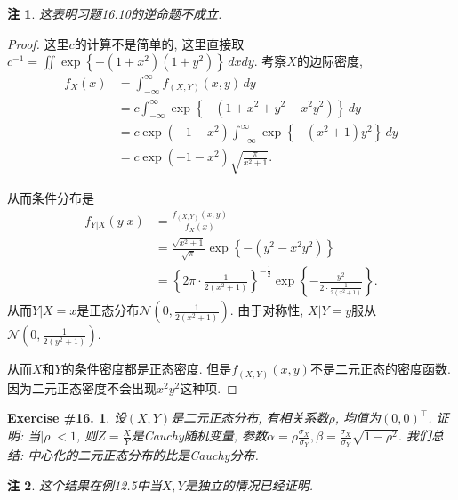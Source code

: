 \documentclass[UTF8, a4paper]{article}
\newtheorem{exercise}{Exercise \#16.}
\newtheorem*{remark}{注}
\begin{document}
\begin{remark}
这表明习题16.10的逆命题不成立.
\end{remark}


\begin{proof}
这里\(c\)的计算不是简单的, 这里直接取\(c^{-1} = \iint \exp \left\{-\left(1+x^2\right)\left(1+y^2\right)\right\} \, dx dy\).
考察\(X\)的边际密度,
\begin{align*}
f_X(x) &= \int_{-\infty}^\infty f_{(X,Y)}(x, y) \, dy \\
&= c \int_{-\infty}^\infty \exp \left\{-\left(1+x^2+y^2 + x^2 y^2\right)\right\} \, dy \\
&= c \exp\left( - 1 - x^2\right)\int_{-\infty}^\infty \exp \left\{-(x^2 + 1) y^2\right\} \, dy \\
&= c \exp\left( - 1 - x^2\right) \sqrt{\frac{\pi}{x^2 + 1}}.
\end{align*}

从而条件分布是
\begin{align*}
    f_{Y|X}(y|x) &= \frac{f_{(X,Y)}(x, y)}{f_X(x)} \\
    &= \frac{\sqrt{x^2 + 1}}{\sqrt{\pi}} \exp\left\{-\left(y^2 - x^2 y^2\right)\right\} \\
    &= \left\{2\pi \cdot \frac{1}{2(x^2 + 1)}\right\}^{-\frac{1}{2}} \exp \left\{-\frac{y^2}{2 \cdot \frac{1}{2(x^2 + 1)}}\right\}.
\end{align*}
从而\(Y|X = x\)是正态分布\(\mathcal{N}\left(0, \frac{1}{2(x^2 + 1)}\right)\). 由于对称性, 
\(X|Y = y\)服从\(\mathcal{N}\left(0, \frac{1}{2(y^2 + 1)}\right)\).

从而\(X\)和\(Y\)的条件密度都是正态密度. 但是\(f_{(X,Y)}(x, y)\)不是二元正态的密度函数. 因为二元正态密度不会出现\(x^2 y^2\)这种项.
\end{proof}


\begin{framed}
\begin{exercise}
设\((X,Y)\)是二元正态分布, 有相关系数\(\rho\), 均值为\((0,0)^\top\). 证明:
当\(|\rho| <1\), 则\(Z = \frac{X}{Y}\)是Cauchy随机变量, 参数\(\alpha = \rho\frac{\sigma_X}{\sigma_Y}, \beta = \frac{\sigma_X}{\sigma_Y}\sqrt{1 - \rho^2}\).
我们总结: 中心化的二元正态分布的比是Cauchy分布.
\end{exercise}
\end{framed}

\begin{remark}
    这个结果在例12.5中当\(X,Y\)是独立的情况已经证明.
\end{remark}
\end{document}
